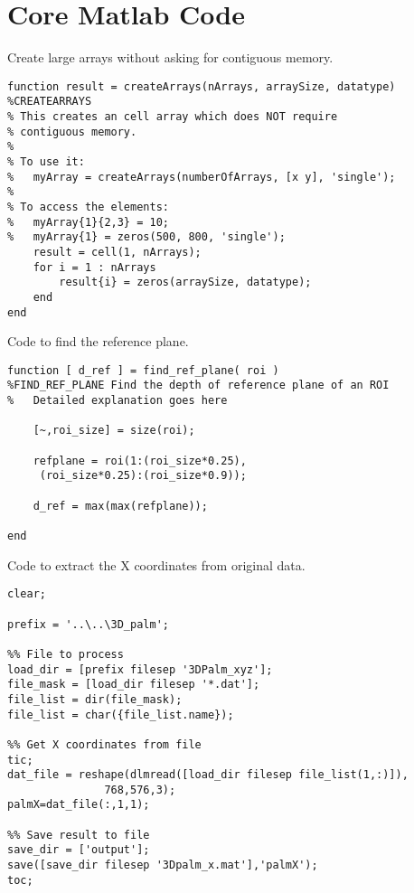 \chapter{Core Matlab Code\label{ch:code}}

\singlespacing

Create large arrays without asking for contiguous memory.

\begin{verbatim}
function result = createArrays(nArrays, arraySize, datatype)
%CREATEARRAYS
% This creates an cell array which does NOT require
% contiguous memory.
%
% To use it:
%   myArray = createArrays(numberOfArrays, [x y], 'single');
%
% To access the elements:
%   myArray{1}{2,3} = 10;
%   myArray{1} = zeros(500, 800, 'single');
    result = cell(1, nArrays);
    for i = 1 : nArrays
        result{i} = zeros(arraySize, datatype);
    end
end
\end{verbatim}


Code to find the reference plane.

\begin{verbatim}
function [ d_ref ] = find_ref_plane( roi )
%FIND_REF_PLANE Find the depth of reference plane of an ROI
%   Detailed explanation goes here

	[~,roi_size] = size(roi);

	refplane = roi(1:(roi_size*0.25),
	 (roi_size*0.25):(roi_size*0.9));

	d_ref = max(max(refplane));

end
\end{verbatim}

\clearpage

Code to extract the X coordinates from original data.
\begin{verbatim}
clear;

prefix = '..\..\3D_palm';

%% File to process
load_dir = [prefix filesep '3DPalm_xyz'];
file_mask = [load_dir filesep '*.dat'];
file_list = dir(file_mask);
file_list = char({file_list.name});

%% Get X coordinates from file
tic;
dat_file = reshape(dlmread([load_dir filesep file_list(1,:)]),
			   768,576,3);
palmX=dat_file(:,1,1);

%% Save result to file
save_dir = ['output'];
save([save_dir filesep '3Dpalm_x.mat'],'palmX');
toc;
\end{verbatim}


